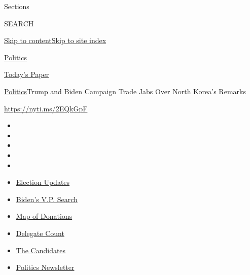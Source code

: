 Sections

SEARCH

\protect\hyperlink{site-content}{Skip to
content}\protect\hyperlink{site-index}{Skip to site index}

\href{https://www.nytimes.com/section/politics}{Politics}

\href{https://myaccount.nytimes.com/auth/login?response_type=cookie\&client_id=vi}{}

\href{https://www.nytimes.com/section/todayspaper}{Today's Paper}

\href{/section/politics}{Politics}\textbar{}Trump and Biden Campaign
Trade Jabs Over North Korea's Remarks

\url{https://nyti.ms/2EQkGpF}

\begin{itemize}
\item
\item
\item
\item
\item
\end{itemize}

\begin{itemize}
\item
  \href{https://www.nytimes.com/2020/07/31/us/elections/biden-vs-trump.html?action=click\&pgtype=Article\&state=default\&region=TOP_BANNER\&context=storylines_menu}{Election
  Updates}
\item
  \href{https://www.nytimes.com/article/biden-vice-president-2020.html?action=click\&pgtype=Article\&state=default\&region=TOP_BANNER\&context=storylines_menu}{Biden's
  V.P. Search}
\item
  \href{https://www.nytimes.com/interactive/2020/07/24/us/politics/trump-biden-campaign-donors.html?action=click\&pgtype=Article\&state=default\&region=TOP_BANNER\&context=storylines_menu}{Map
  of Donations}
\item
  \href{https://www.nytimes.com/interactive/2020/us/elections/delegate-count-primary-results.html?action=click\&pgtype=Article\&state=default\&region=TOP_BANNER\&context=storylines_menu}{Delegate
  Count}
\item
  \href{https://www.nytimes.com/interactive/2019/us/politics/2020-presidential-candidates.html?action=click\&pgtype=Article\&state=default\&region=TOP_BANNER\&context=storylines_menu}{The
  Candidates}
\item
  \href{https://www.nytimes.com/newsletters/politics?action=click\&pgtype=Article\&state=default\&region=TOP_BANNER\&context=storylines_menu}{Politics
  Newsletter}
\end{itemize}

